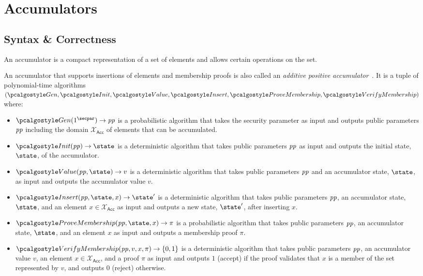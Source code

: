 \section{Accumulators}\label{sec:accumulators}

\subsection{Syntax \& Correctness}

An accumulator is a compact representation of a set of elements and allows certain operations on the set.

\begin{definition}[Accumulator]\label{def:accumulator}
An accumulator that supports insertions of elements and membership proofs is also called an \emph{additive positive accumulator}~\cite{RSA:BalCanYak20}.
It is a tuple of polynomial-time algorithms $(\algo{Gen}, \algo{Init}, \algo{Value}, \algo{Insert}, \algo{ProveMembership}, \algo{VerifyMembership})$ where:

\begin{itemize}
    \item $\algo{Gen}(1^\secpar) \rightarrow \params$ is a probabilistic algorithm that takes the security parameter as input and outputs public parameters $\mathit{pp}$ including the domain $\mathcal{X}_\mathsf{Acc}$ of elements that can be accumulated.
    \item $\algo{Init}(\params) \rightarrow \state$ is a deterministic algorithm that takes public parameters $\mathit{pp}$ as input and outputs the initial state, $\state$, of the accumulator.
    \item $\algo{Value}(\params, \state) \rightarrow v$ is a deterministic algorithm that takes public parameters $\mathit{pp}$ and an accumulator state, $\state$, as input and outputs the accumulator value $v$.
    \item $\algo{Insert}(\params, \state, x) \rightarrow \state'$ is a deterministic algorithm that takes public parameters $\mathit{pp}$, an accumulator state, $\state$, and an element $x \in \mathcal{X}_\mathsf{Acc}$ as input and outputs a new state, $\state'$, after inserting $x$.
    \item $\algo{ProveMembership}(\params, \state, x) \rightarrow \pi$ is a probabilistic algorithm that takes public parameters $\mathit{pp}$, an accumulator state, $\state$, and an element $x$ as input and outputs a membership proof $\pi$.
    \item $\algo{VerifyMembership}(\params, v, x, \pi) \rightarrow \{0, 1\}$ is a deterministic algorithm that takes public parameters $\mathit{pp}$, an accumulator value $v$, an element $x \in \mathcal{X}_\mathsf{Acc}$, and a proof $\pi$ as input and outputs $1$ (accept) if the proof validates that $x$ is a member of the set represented by $v$, and outputs $0$ (reject) otherwise.
\end{itemize}
\end{definition}

